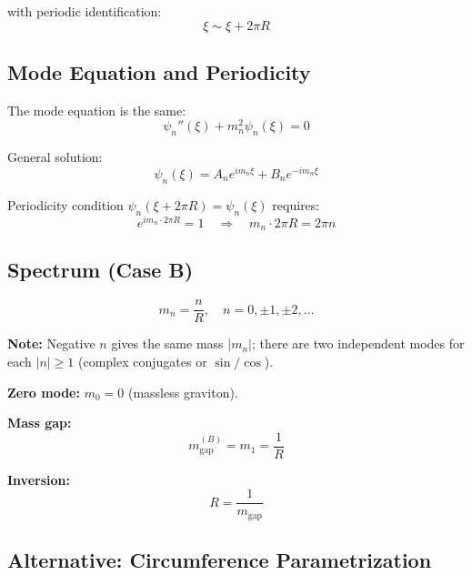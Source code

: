 \documentclass[11pt,a4paper]{article}
\newcommand{\mgap}{m_{\mathrm{gap}}}
\begin{document}
with periodic identification:
\begin{equation}
\xi \sim \xi + 2\pi R
\label{eq:caseB-periodic}
\end{equation}

\subsection{Mode Equation and Periodicity}

The mode equation is the same:
\begin{equation}
\psi_n''(\xi) + m_n^2 \psi_n(\xi) = 0
\label{eq:caseB-mode-eq}
\end{equation}

General solution:
\begin{equation}
\psi_n(\xi) = A_n e^{im_n\xi} + B_n e^{-im_n\xi}
\label{eq:caseB-general}
\end{equation}

Periodicity condition $\psi_n(\xi + 2\pi R) = \psi_n(\xi)$ requires:
\begin{equation}
e^{im_n \cdot 2\pi R} = 1 \quad \Rightarrow \quad m_n \cdot 2\pi R = 2\pi n
\label{eq:caseB-quantization-step}
\end{equation}

\subsection{Spectrum (Case B)}

\begin{equation}
\boxed{m_n = \frac{n}{R}, \quad n = 0, \pm 1, \pm 2, \ldots}
\label{eq:spectrum-B}
\end{equation}

\textbf{Note:} Negative $n$ gives the same mass $|m_n|$; there are two independent
modes for each $|n| \geq 1$ (complex conjugates or $\sin/\cos$).

\textbf{Zero mode:} $m_0 = 0$ (massless graviton).

\textbf{Mass gap:}
\begin{equation}
\mgap^{(B)} = m_1 = \frac{1}{R}
\label{eq:mgap-B}
\end{equation}

\textbf{Inversion:}
\begin{equation}
\boxed{R = \frac{1}{\mgap}}
\label{eq:R-from-mgap}
\end{equation}

\subsection{Alternative: Circumference Parametrization}
\end{document}
